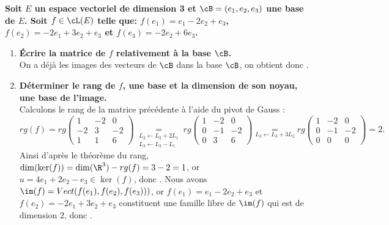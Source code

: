 \documentclass[a4paper, 11pt,reqno]{article}
\begin{document}
\begin{correction}  \;
	\textbf{Soit $E$ un espace vectoriel de dimension 3 et $\cB=(e_1,e_2,e_3)$ une base de $E$. Soit $f\in\cL(E)$ telle que: $f(e_1)=e_1-2e_2+e_3$, $f(e_2)=-2e_1+3e_2+e_3$ et $f(e_3)=-2e_2+6e_3$. }
	\begin{enumerate}
		\item \textbf{\'Ecrire la matrice de $f$ relativement \`a la base $\cB$.}\\
		      On a d\'ej\`a les images des vecteurs de $\cB$ dans la base $\cB$, on obtient donc .
		\item \textbf{D\'eterminer le rang de $f$, une base et la dimension de son noyau, une base de l'image.}\\
		      Calculons le rang de la matrice pr\'ec\'edente \`a l'aide du pivot de Gauss :
		      $$ rg(f) = rg\left(\begin{array}{rrr}
					      1  & -2 & 0  \\
					      -2 & 3  & -2 \\
					      1  & 1  & 6
				      \end{array}\right)
			      \underset{\substack{ L_2 \leftarrow L_2 + 2L_1 \\  L_3 \leftarrow L_3-L_1}}{=}
			      rg\left(\begin{array}{rrr}
					      1 & -2 & 0  \\
					      0 & -1 & -2 \\
					      0 & 3  & 6
				      \end{array}\right)
			      \underset{ L_3 \leftarrow L_3 + 3L_2 }{=}
			      rg\left(\begin{array}{rrr}
					      1 & -2 & 0  \\
					      0 & -1 & -2 \\
					      0 & 0  & 0
				      \end{array}\right) = 2 .$$
		      Ainsi d'apr\`es le th\'eor\`eme du rang, $\dim(\ker(f)) = \dim(\R^3) - rg(f) = 3-2 = 1$, or $u=4e_1 +2e_2 -e_3 \in \ker(f)$, donc . Nous avons $\im(f) = Vect(f(e_1),f(e_2),f(e_3)))$, or $f(e_1)=e_1-2e_2+e_3$ et $f(e_2)=-2e_1+3e_2+e_3$ constituent une famille libre de $\im(f)$ qui est de dimension $2$, donc .

	\end{enumerate}
\end{correction}
\end{document}
